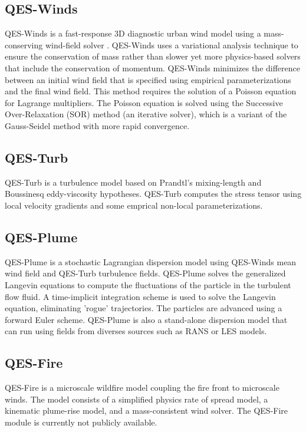 \subsection{QES-Winds}

QES-Winds is a fast-response 3D diagnostic urban wind model using a mass-conserving wind-field solver \cite{Bozorgmehr2021}. QES-Winds uses a variational analysis technique to ensure the conservation of mass rather than slower yet more physics-based solvers that include the conservation of momentum. QES-Winds minimizes the difference between an initial wind field that is specified using empirical parameterizations and the final wind field. This method requires the solution of a Poisson equation for Lagrange multipliers. The Poisson equation is solved using the Successive Over-Relaxation (SOR) method (an iterative solver), which is a variant of the Gauss-Seidel method with more rapid convergence.

\subsection{QES-Turb}

QES-Turb is a turbulence model based on Prandtl’s mixing-length and Boussinesq eddy-viscosity hypotheses. QES-Turb computes the stress tensor using local velocity gradients and some emprical non-local parameterizations.

\subsection{QES-Plume}

QES-Plume is a stochastic Lagrangian dispersion model using QES-Winds mean wind field and QES-Turb turbulence fields. QES-Plume solves the generalized Langevin equations to compute the fluctuations of the particle in the turbulent flow fluid. A time-implicit integration scheme is used to solve the Langevin equation, eliminating 'rogue' trajectories. The particles are advanced using a forward Euler scheme. QES-Plume is also a stand-alone dispersion model that can run using fields from diverses sources such as RANS or LES models.


\subsection{QES-Fire}

QES-Fire is a microscale wildfire model coupling the fire front to microscale winds. The model consists of a simplified physics rate of spread model, a kinematic plume-rise model, and a mass-consistent wind solver. The QES-Fire module is currently not publicly available.


